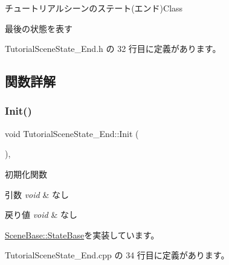 チュートリアルシーンのステート(エンド)Class

最後の状態を表す 

 Tutorial\+Scene\+State\+\_\+\+End.\+h の 32 行目に定義があります。



\subsection{関数詳解}
\mbox{\label{class_tutorial_scene_state___end_a572e5687140ff5ac43789f90462c05a5}} 
\subsubsection{\texorpdfstring{Init()}{Init()}}
{\footnotesize\ttfamily void Tutorial\+Scene\+State\+\_\+\+End\+::\+Init (\begin{DoxyParamCaption}{ }\end{DoxyParamCaption})\hspace{0.3cm}{\ttfamily [override]}, {\ttfamily [virtual]}}



初期化関数 


\begin{DoxyParams}{引数}
{\em void} & なし \\
\hline
\end{DoxyParams}

\begin{DoxyRetVals}{戻り値}
{\em void} & なし \\
\hline
\end{DoxyRetVals}


\mbox{\hyperlink{class_scene_base_1_1_state_base_a33350231b039a2178c19beac0211c5b8}{Scene\+Base\+::\+State\+Base}}を実装しています。



 Tutorial\+Scene\+State\+\_\+\+End.\+cpp の 34 行目に定義があります。

